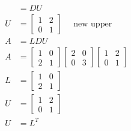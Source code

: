 \documentclass[main.tex]{subfiles}
\begin{document}
\begin{enumerate}
$$\begin{aligned}
    & =D U\\
    U &= \left[\begin{array}{ll}
    1 & 2 \\
    0 & 1
    \end{array}\right] \quad \text{ new upper}\\
    A &= L D U \\
    A &= \left[\begin{array}{ll}
    1 & 0 \\
    2 & 1
    \end{array}\right]\left[\begin{array}{ll}
    2 & 0 \\
    0 & 3
    \end{array}\right]\left[\begin{array}{ll}
    1 & 2 \\
    0 & 1
    \end{array}\right]\\
    L &= \left[\begin{array}{ll}
    1 & 0 \\
    2 & 1
    \end{array}\right]\\ 
    U &= \left[\begin{array}{ll}
    1 & 2 \\
    0 & 1
    \end{array}\right]\\
    U &=L^{T}
    \end{aligned}
    $$
    

\end{enumerate}
\end{document}
